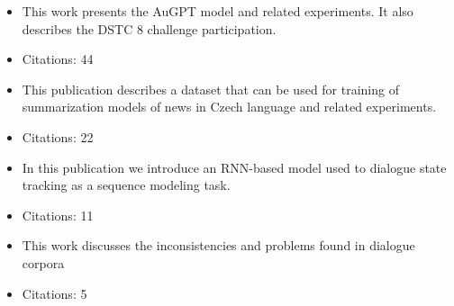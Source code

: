 \noindent{}
\begin{itemize}[noitemsep,topsep=0pt]

\item This work presents the AuGPT model and related experiments. It also describes the DSTC 8 challenge participation.
\item Citations: 44

\end{itemize}\vspace{.5\baselineskip}

\noindent{}
\begin{itemize}[noitemsep,topsep=0pt]

\item This publication describes a dataset that can be used for training of summarization models of news in Czech language and related experiments.
\item Citations: 22

\end{itemize}\vspace{.5\baselineskip}

\noindent{}
\begin{itemize}[noitemsep,topsep=0pt]

\item In this publication we introduce an RNN-based model used to dialogue state tracking as a sequence modeling task.

\item Citations: 11

\end{itemize}\vspace{.5\baselineskip}

\noindent{}
\begin{itemize}[noitemsep,topsep=0pt]

\item This work discusses the inconsistencies and problems found in dialogue corpora
\item Citations: 5

\end{itemize}\vspace{.5\baselineskip}

